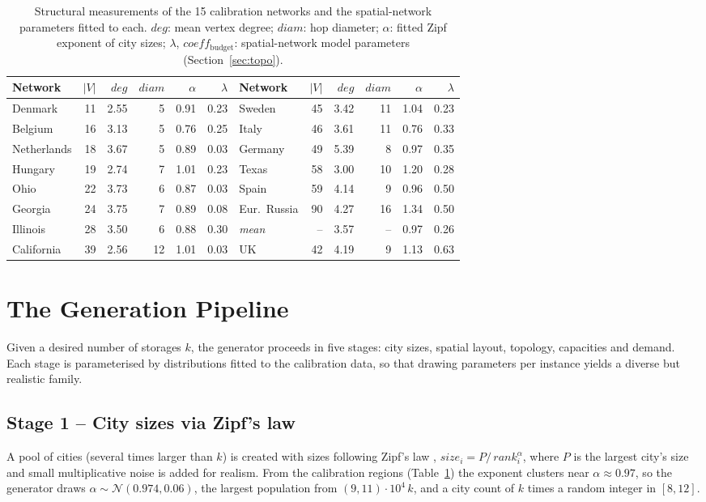 \documentclass[runningheads]{llncs}
\begin{document}
\begin{table}[t]
\centering
\caption{Structural measurements of the 15 calibration networks and the
spatial-network parameters fitted to each. $deg$: mean vertex degree;
$diam$: hop diameter; $\alpha$: fitted Zipf exponent of city sizes;
$\lambda$, $coeff_{\text{budget}}$: spatial-network model parameters
(Section~\ref{sec:topo}).}
\label{tab:real-struct}
\footnotesize
\setlength{\tabcolsep}{3.4pt}
\begin{tabular}{lrrrrr@{\hskip 1.0em}lrrrrr}
\toprule
Network & $|V|$ & $deg$ & $diam$ & $\alpha$ & $\lambda$ &
Network & $|V|$ & $deg$ & $diam$ & $\alpha$ & $\lambda$\\
\midrule
Denmark      & 11 & 2.55 & 5  & 0.91 & 0.23 & Sweden         & 45 & 3.42 & 11 & 1.04 & 0.23\\
Belgium      & 16 & 3.13 & 5  & 0.76 & 0.25 & Italy          & 46 & 3.61 & 11 & 0.76 & 0.33\\
Netherlands  & 18 & 3.67 & 5  & 0.89 & 0.03 & Germany        & 49 & 5.39 & 8  & 0.97 & 0.35\\
Hungary      & 19 & 2.74 & 7  & 1.01 & 0.23 & Texas          & 58 & 3.00 & 10 & 1.20 & 0.28\\
Ohio         & 22 & 3.73 & 6  & 0.87 & 0.03 & Spain          & 59 & 4.14 & 9  & 0.96 & 0.50\\
Georgia      & 24 & 3.75 & 7  & 0.89 & 0.08 & Eur.\ Russia   & 90 & 4.27 & 16 & 1.34 & 0.50\\
Illinois     & 28 & 3.50 & 6  & 0.88 & 0.30 & \textit{mean}  & -- & 3.57 & -- & 0.97 & 0.26\\
California   & 39 & 2.56 & 12 & 1.01 & 0.03 & UK             & 42 & 4.19 & 9  & 1.13 & 0.63\\
\bottomrule
\end{tabular}
\end{table}

\section{The Generation Pipeline}
\label{sec:pipeline}

Given a desired number of storages $k$, the generator proceeds in five stages:
city sizes, spatial layout, topology, capacities and demand. Each stage is
parameterised by distributions fitted to the calibration data, so that drawing
parameters per instance yields a diverse but realistic family.

\subsection{Stage 1 -- City sizes via Zipf's law}
A pool of cities (several times larger than $k$) is created with sizes following
Zipf's law \cite{gabaix1999}, $size_i=P/\,rank_i^{\alpha}$, where $P$ is the
largest city's size and small multiplicative noise is added for realism. From
the calibration regions (Table~\ref{tab:real-struct}) the exponent clusters near
$\alpha\approx0.97$, so the generator draws
$\alpha\sim\mathcal{N}(0.974,0.06)$, the largest population from
$(9,11)\cdot 10^4\,k$, and a city count of $k$ times a random integer in
$[8,12]$.
\end{document}
